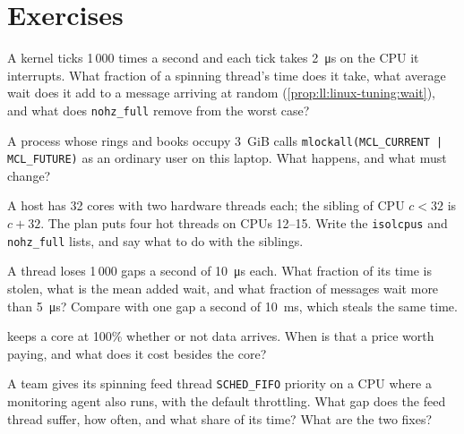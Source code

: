 \section{Exercises}

\begin{exercise}[$\star$]\label{exo:ll:linux-tuning:1}
A kernel ticks 1\,000 times a second and each tick takes \qty{2}{\micro\second} on the CPU it interrupts. What fraction of a
spinning thread's time does it take, what average wait does it add to a message arriving at random
(\cref{prop:ll:linux-tuning:wait}), and what does \texttt{nohz\_full} remove from the worst case?
\end{exercise}

\begin{exercise}[$\star$]\label{exo:ll:linux-tuning:2}
A process whose rings and books occupy 3~GiB calls \texttt{mlockall(MCL\_CURRENT | MCL\_FUTURE)} as an ordinary user on this
laptop. What happens, and what must change?
\end{exercise}

\begin{exercise}[$\star$]\label{exo:ll:linux-tuning:3}
A host has 32 cores with two hardware threads each; the sibling of CPU $c < 32$ is $c + 32$. The plan puts four hot threads on
CPUs 12--15. Write the \texttt{isolcpus} and \texttt{nohz\_full} lists, and say what to do with the siblings.
\end{exercise}

\begin{exercise}[$\star\star$]\label{exo:ll:linux-tuning:4}
A thread loses 1\,000 gaps a second of \qty{10}{\micro\second} each. What fraction of its time is stolen, what is the mean
added wait, and what fraction of messages wait more than \qty{5}{\micro\second}? Compare with one gap a second of
\qty{10}{\milli\second}, which steals the same time.
\end{exercise}

\begin{exercise}[$\star\star$]\label{exo:ll:linux-tuning:5}
 keeps a core at 100\% whether or not data arrives. When is that a price worth paying, and what does it cost
besides the core?
\end{exercise}

\begin{exercise}[$\star\star$]\label{exo:ll:linux-tuning:6}
A team gives its spinning feed thread \texttt{SCHED\_FIFO} priority on a CPU where a monitoring agent also runs, with the
default throttling. What gap does the feed thread suffer, how often, and what share of its time? What are the two fixes?
\end{exercise}

